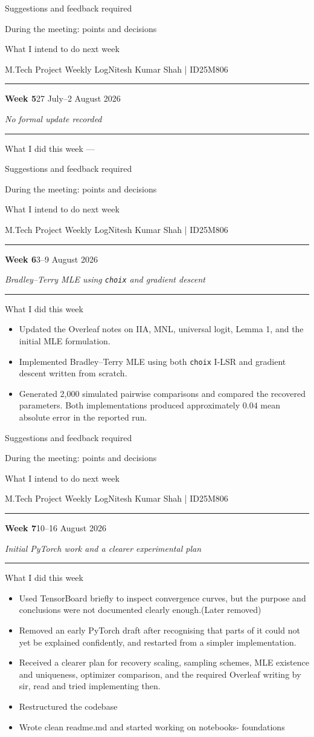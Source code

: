 \documentclass[10pt]{article}
\newcommand{\weekheading}[3]{%
  {\small M.Tech Project Weekly Log}\hfill{\small Nitesh Kumar Shah \;|\; ID25M806}\par
  \vspace{2pt}\hrule\vspace{7pt}
  {\Large\bfseries Week #1}\hfill{\normalsize #2}\par
  \vspace{2pt}
  {\itshape #3}\par
  \vspace{5pt}\hrule\vspace{7pt}
}
\newcommand{\blankentry}{\begin{center}\textemdash\end{center}}
\newcommand{\pastweekboxes}{%
  \begin{weeklybox}{Suggestions and feedback required}
    \blankentry
  \end{weeklybox}
  \begin{weeklybox}{During the meeting: points and decisions}
    \blankentry
  \end{weeklybox}
  \begin{weeklybox}{What I intend to do next week}
    \blankentry
  \end{weeklybox}
}
\begin{document}
\pastweekboxes


\newpage
\weekheading{5}{27 July--2 August 2026}{No formal update recorded}

\begin{weeklybox}{What I did this week}
  ---
\end{weeklybox}

\pastweekboxes


\newpage
\weekheading{6}{3--9 August 2026}{Bradley--Terry MLE using \texttt{choix} and gradient descent}

\begin{weeklybox}{What I did this week}
  \begin{itemize}
    \item Updated the Overleaf notes on IIA, MNL, universal logit, Lemma 1, and the initial MLE formulation.
    \item Implemented Bradley--Terry MLE using both \texttt{choix} I-LSR and gradient descent written from scratch.
    \item Generated 2,000 simulated pairwise comparisons and compared the recovered parameters. Both implementations produced approximately $0.04$ mean absolute error in the reported run.
  \end{itemize}
\end{weeklybox}

\pastweekboxes


\newpage
\weekheading{7}{10--16 August 2026}{Initial PyTorch work and a clearer experimental plan}

\begin{weeklybox}{What I did this week}
  \begin{itemize}
    \item Used TensorBoard briefly to inspect convergence curves, but the purpose and conclusions were not documented clearly enough.(Later removed)
    \item Removed an early PyTorch draft after recognising that parts of it could not yet be explained confidently, and restarted from a simpler implementation.
    \item Received a clearer plan for recovery scaling, sampling schemes, MLE existence and uniqueness, optimizer comparison, and the required Overleaf writing by sir, read and tried implementing then.
    \item Restructured the codebase
    \item Wrote clean readme.md and started working on notebooks- foundations
  \end{itemize}
\end{weeklybox}
\end{document}
